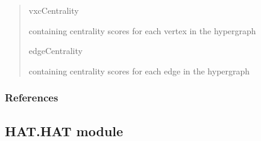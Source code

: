 \documentclass[letterpaper,10pt,english]{sphinxmanual}
\begin{document}
\begin{fulllineitems}
\begin{fulllineitems}
\begin{quote}
\begin{description}
\begin{itemize}
\end{itemize}

\sphinxAtStartPar
vxcCentrality

\sphinxAtStartPar
{} containing centrality scores for each vertex in the hypergraph

\sphinxAtStartPar
edgeCentrality

\sphinxAtStartPar
{} containing centrality scores for each edge in the hypergraph

\end{description}\end{quote}
\subsubsection*{References}

\end{fulllineitems}


\end{fulllineitems}



\subsection{HAT.HAT module}
\label{\detokenize{HAT:module-HAT.HAT}}\label{\detokenize{HAT:hat-hat-module}}
\end{document}
